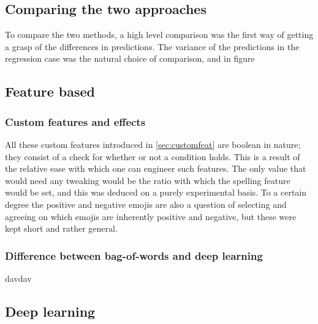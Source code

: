 \subsection{Comparing the two approaches}
To compare the two methods, a high level comparison was the first way of getting a grasp of the differences in predictions. The variance of the predictions in the regression case was the natural choice of comparison, and in figure 


\subsection{Feature based}
\subsubsection{Custom features and effects}
All these custom features introduced in \ref{sec:customfeat} are boolean in nature; they consist of a check for whether or not a condition holds. This is a result of the relative ease with which one can engineer such features. The only value that would need any tweaking would be the ratio with which the spelling feature would be set, and this was deduced on a purely experimental basis. To a certain degree the positive and negative emojis are also a question of selecting and agreeing on which emojis are inherently positive and negative, but these were kept short and rather general.

\subsubsection{Difference between bag-of-words and deep learning}
davdav

\subsection{Deep learning}
